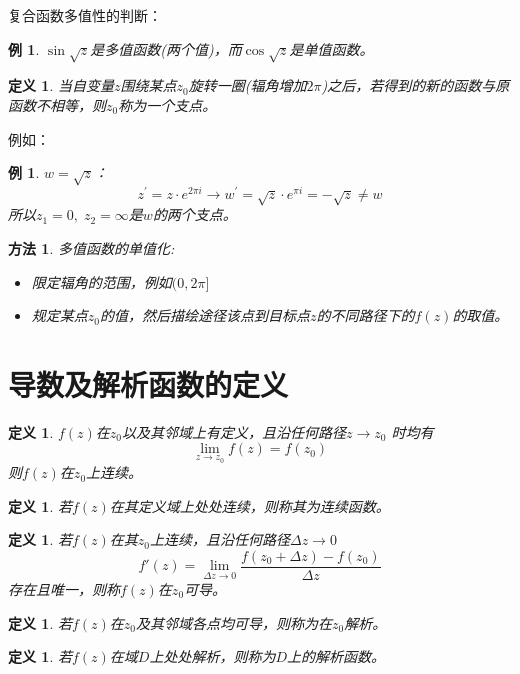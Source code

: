 \documentclass[10pt, a4paper, oneside]{ctexbook}
\newtheorem{definition}[theorem]{定义}
\newtheorem{example}[theorem]{例}
\newtheorem{method}[theorem]{方法}
\begin{document}
复合函数多值性的判断：
\begin{example}
    $\sin \sqrt{z}$是多值函数(两个值)，而$\cos \sqrt{z}$是单值函数。
\end{example}
\begin{definition}
    当自变量$z$围绕某点$z_0$旋转一圈(辐角增加$2\pi$)之后，若得到的新的函数与原函数不相等，则$z_0$称为一个支点。
\end{definition}
例如：
\begin{example}
    $w=\sqrt{z}$：
    $$z^\prime=z\cdot e^{2\pi i}\to w^\prime=\sqrt{z}\cdot e^{ \pi i} = - \sqrt{z} \ne w$$
    所以$z_1 = 0,\;z_2=\infty$是$w$的两个支点。
\end{example}

\begin{method}
    多值函数的单值化:
    \begin{itemize}
        \item 限定辐角的范围，例如$(0,2\pi]$
        \item 规定某点$z_0$的值，然后描绘途径该点到目标点$z$的不同路径下的$f(z)$的取值。
    \end{itemize}
\end{method}

\section{导数及解析函数的定义}
\begin{definition}
    $f(z)$在$z_0$以及其邻域上有定义，且沿任何路径$z\to z_0$
    时均有 $$\lim_{z\to z_0}f(z)=f(z_0)$$
    则$f(z)$在$z_0$上连续。
\end{definition}
\begin{definition}
    若$f(z)$在其定义域上处处连续，则称其为连续函数。
\end{definition}
\begin{definition}
    若$f(z)$在其$z_0$上连续，且沿任何路径$\Delta z \to 0$
    $$
        f' (z) =\lim_{\Delta z \to 0} \frac{f(z_0+\Delta z)-f(z_0)}{\Delta z}
    $$
    存在且唯一，则称$f(z)$在$z_0$可导。
\end{definition}
\begin{definition}
    若$f(z)$在$z_0$及其邻域各点均可导，则称为在$z_0$解析。
\end{definition}
\begin{definition}
    若$f(z)$在域$D$上处处解析，则称为$D$上的解析函数。
\end{definition}
\end{document}
